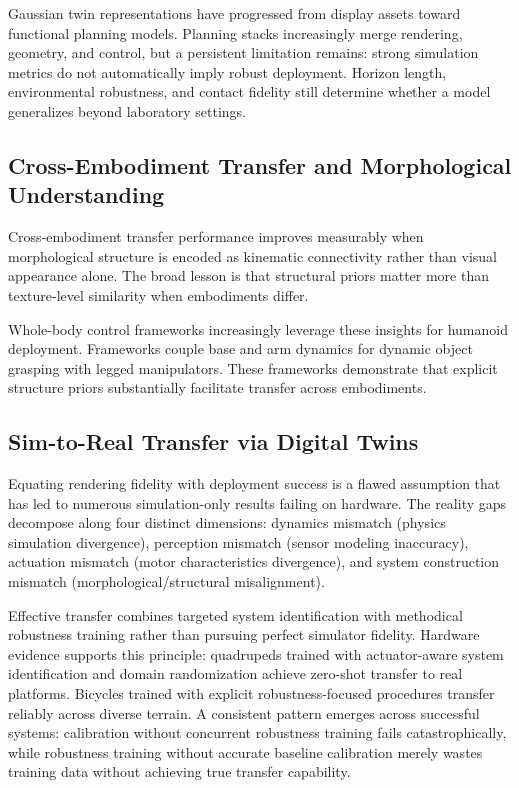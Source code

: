 \documentclass[12pt,a4paper,oneside]{report}
\begin{document}
Gaussian twin representations have progressed from display assets toward functional planning models. Planning stacks increasingly merge rendering, geometry, and control, but a persistent limitation remains: strong simulation metrics do not automatically imply robust deployment. Horizon length, environmental robustness, and contact fidelity still determine whether a model generalizes beyond laboratory settings.

\subsection{Cross-Embodiment Transfer and Morphological Understanding}

Cross-embodiment transfer performance improves measurably when morphological structure is encoded as kinematic connectivity rather than visual appearance alone. The broad lesson is that structural priors matter more than texture-level similarity when embodiments differ.

Whole-body control frameworks increasingly leverage these insights for humanoid deployment. Frameworks couple base and arm dynamics for dynamic object grasping with legged manipulators. These frameworks demonstrate that explicit structure priors substantially facilitate transfer across embodiments.

\subsection{Sim-to-Real Transfer via Digital Twins}

Equating rendering fidelity with deployment success is a flawed assumption that has led to numerous simulation-only results failing on hardware. The reality gaps decompose along four distinct dimensions: dynamics mismatch (physics simulation divergence), perception mismatch (sensor modeling inaccuracy), actuation mismatch (motor characteristics divergence), and system construction mismatch (morphological/structural misalignment).

Effective transfer combines targeted system identification with methodical robustness training rather than pursuing perfect simulator fidelity. Hardware evidence supports this principle: quadrupeds trained with actuator-aware system identification and domain randomization achieve zero-shot transfer to real platforms. Bicycles trained with explicit robustness-focused procedures transfer reliably across diverse terrain. A consistent pattern emerges across successful systems: calibration without concurrent robustness training fails catastrophically, while robustness training without accurate baseline calibration merely wastes training data without achieving true transfer capability.
\end{document}
